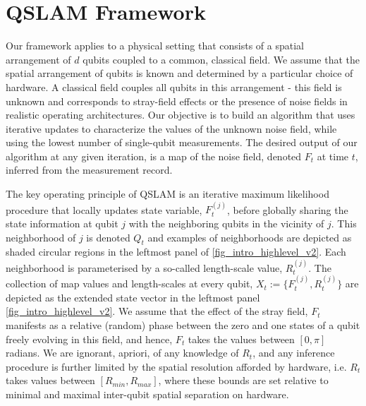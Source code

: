 \section{QSLAM Framework \label{sec:qslam}}
Our framework applies to a physical setting that consists of a spatial arrangement of $d$ qubits coupled to a common, classical field. We assume that the spatial arrangement of qubits is known and determined by a particular choice of hardware. A classical field couples all qubits in this arrangement - this field is unknown and corresponds to stray-field effects or the presence of noise fields in realistic operating architectures.  Our objective is to build an algorithm that uses iterative updates to characterize the values of the unknown noise field, while using the lowest number of single-qubit measurements. The desired output of our algorithm at any given iteration, is a map of the noise field, denoted $F_t$ at time $t$, inferred from the measurement record. 

\iffalse
Inspired by classical algorithms for simultaneous localisation and mapping problems, in particular \cite{thrun2001probabilistic}, QSLAM reconstructs a map by not only filtering single qubit measurements, but by sharing information between qubits in small spatial regions called `neighborhoods'. We consider both 1D and 2D spatial arrangements where qubits are subject to a time-invariant $F_t$. In making a measurement, we assume that a single qubit is addressed and measured once during each iteration, and these measurements are single qubit Ramsey measurements. An example in 1D of such a physical setting are stray magnetic field gradients which couple a line of trapped ions along the axial trap axis. The algorithm is structured to incorporate additional complexity as we introduce realistic operating environments for quantum computing hardware, for example, dynamics for $F_t$.
\fi 

The key operating principle of QSLAM is an iterative maximum likelihood procedure that locally updates state variable, $F_t^{(j)}$, before globally sharing the state information at qubit $j$ with the neighboring qubits in the vicinity of $j$. This neighborhood of $j$ is  denoted $Q_t$ and examples of neighborhoods are depicted as shaded circular regions in the leftmost panel of \cref{fig_intro_highlevel_v2}. Each neighborhood is parameterised by a so-called length-scale value, $R_t^{(j)}$.   The collection of map values and length-scales at every qubit, $X_t:=\{F_t^{(j)}, R_t^{(j)}\}$ are depicted as the extended state vector in the leftmost panel \cref{fig_intro_highlevel_v2}.  We assume that the effect of the stray field, $F_t$ manifests as a relative (random) phase between the zero and one states of a qubit freely evolving in this field, and hence, $F_t$ takes the values between $[0, \pi]$ radians. We are ignorant, apriori, of any knowledge of $R_t$, and any inference procedure is further limited by the spatial resolution afforded by hardware, i.e. $R_t$ takes values between $[R_{min}, R_{max}]$, where these bounds are set relative to minimal and maximal inter-qubit spatial separation on hardware.

